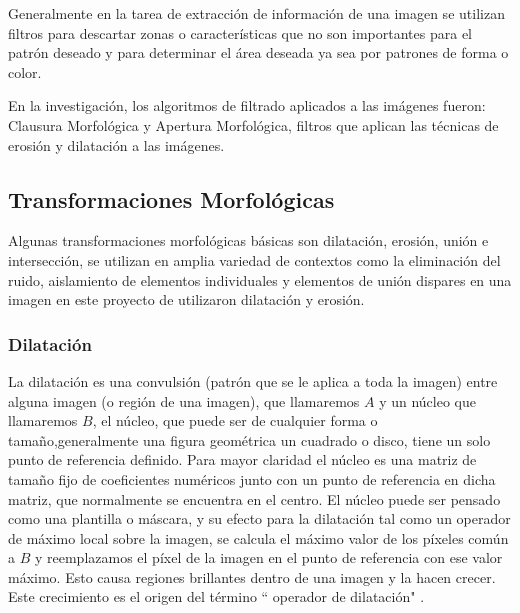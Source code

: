 Generalmente en la tarea de extracción de información de una imagen se utilizan filtros para descartar zonas o características que no son importantes para el patrón deseado y para determinar el área deseada ya sea por patrones de forma o color.

En la investigación, los algoritmos de filtrado aplicados a las imágenes fueron: Clausura Morfológica y Apertura Morfológica, filtros que aplican las técnicas de erosión y dilatación a las imágenes.

\subsection*{Transformaciones Morfológicas}\label{sec:Transfor}
Algunas transformaciones morfológicas básicas son dilatación, erosión, uni\'on e intersecci\'on, se utilizan en amplia variedad de contextos como la eliminación del ruido, aislamiento de elementos individuales y elementos de unión dispares en una imagen en este proyecto de utilizaron dilataci\'on y erosi\'on.\cite{BookOpenCv}

\subsubsection{Dilatación}
La dilatación es una convulsión (patr\'on que se le aplica a toda la imagen) entre alguna imagen (o región de una imagen), que llamaremos $A$ y un núcleo que llamaremos $B$, el núcleo, que puede ser de cualquier forma o tamaño,generalmente una figura geom\'etrica un cuadrado o disco, tiene un solo punto de referencia definido. Para mayor claridad el n\'ucleo es una matriz de tamaño fijo de coeficientes numéricos junto con un punto de referencia en dicha matriz, que normalmente se encuentra en el centro. El núcleo puede ser pensado como una plantilla  o m\'ascara, y su efecto para la dilatación tal como un operador de máximo local sobre la imagen, se calcula el m\'aximo valor de los píxeles común a $B$ y reemplazamos el píxel de la imagen en el punto de referencia con ese valor máximo. Esto causa regiones brillantes dentro de una imagen y la hacen crecer. Este crecimiento es el origen del término `` operador de dilatación" \cite{BookOpenCv}. 

